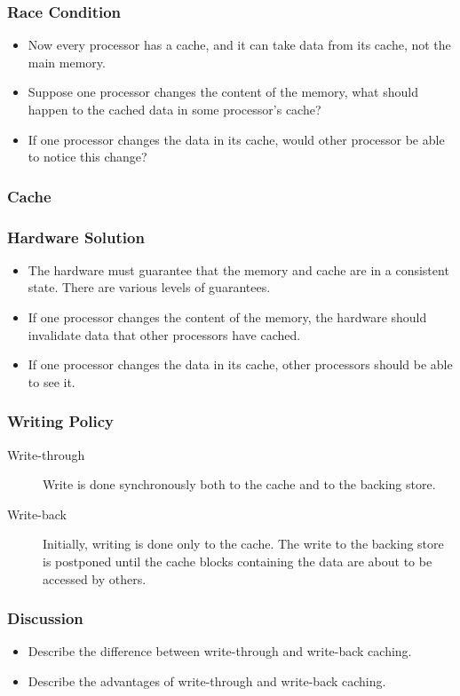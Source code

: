\documentclass{beamer}
\begin{document}
\begin{CJK}{UTF8}{bsmi}
\begin{frame}
\frametitle{Race Condition}
\begin{itemize}
\item Now every processor has a cache, and it can take data from its
  cache, not the main memory.
\item Suppose one processor changes the content of the memory, what
  should happen to the cached data in some processor's cache?
\item If one processor changes the data in its cache, would other
  processor be able to notice this change?
\end{itemize}
\end{frame}

\begin{frame}
\frametitle{Cache}
\centerline{}
\end{frame}

\begin{frame}
\frametitle{Hardware Solution}
\begin{itemize}
\item The hardware must guarantee that the memory and cache are in a consistent state. There are various levels of guarantees.
\item If one processor changes the content of the memory, the hardware should invalidate data that other processors have cached.
\item If one processor changes the data in its cache, other processors should be able to see it.
\end{itemize}
\end{frame}

\begin{frame}
\frametitle{Writing Policy}
\begin{description}
\item[Write-through] Write is done synchronously both to the cache and
  to the backing store.
\item[Write-back] Initially, writing is done only to the cache. The
  write to the backing store is postponed until the cache blocks
  containing the data are about to be accessed by others.
\end{description}
\end{frame}


\begin{frame}
\frametitle{Discussion}
\begin{itemize}
\item Describe the difference between write-through and write-back caching.
\item Describe the advantages of write-through and write-back caching.
\end{itemize}
\end{frame}



\end{CJK}
\end{document}
